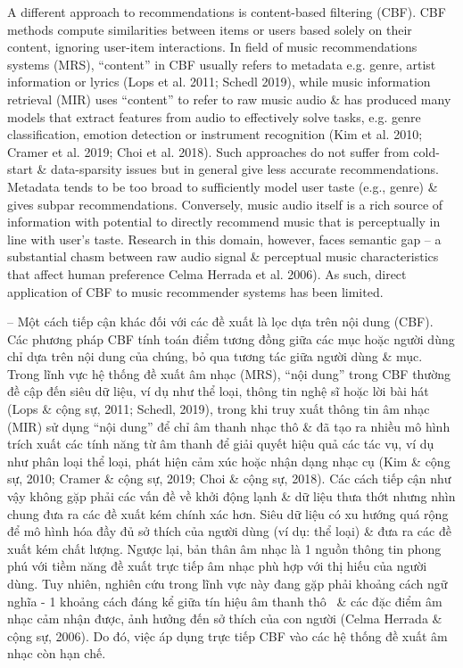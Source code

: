 \documentclass{article}
\begin{document}
\begin{itemize}
    A different approach to recommendations is content-based filtering (CBF). CBF methods compute similarities between items or users based solely on their content, ignoring user-item interactions. In field of music recommendations systems (MRS), ``content'' in CBF usually refers to metadata e.g. genre, artist information or lyrics (Lops et al. 2011; Schedl 2019), while music information retrieval (MIR) uses ``content'' to refer to raw music audio \& has produced many models that extract features from audio to effectively solve tasks, e.g. genre classification, emotion detection or instrument recognition (Kim et al. 2010; Cramer et al. 2019; Choi et al. 2018). Such approaches do not suffer from cold-start \& data-sparsity issues but in general give less accurate recommendations. Metadata tends to be too broad to sufficiently model user taste (e.g., genre) \& gives subpar recommendations. Conversely, music audio itself is a rich source of information with potential to directly recommend music that is perceptually in line with user's taste. Research in this domain, however, faces semantic gap -- a substantial chasm between raw audio signal \& perceptual music characteristics that affect human preference Celma Herrada et al. 2006). As such, direct application of CBF to music recommender systems has been limited.

    -- Một cách tiếp cận khác đối với các đề xuất là lọc dựa trên nội dung (CBF). Các phương pháp CBF tính toán điểm tương đồng giữa các mục hoặc người dùng chỉ dựa trên nội dung của chúng, bỏ qua tương tác giữa người dùng \& mục. Trong lĩnh vực hệ thống đề xuất âm nhạc (MRS), ``nội dung'' trong CBF thường đề cập đến siêu dữ liệu, ví dụ như thể loại, thông tin nghệ sĩ hoặc lời bài hát (Lops \& cộng sự, 2011; Schedl, 2019), trong khi truy xuất thông tin âm nhạc (MIR) sử dụng ``nội dung'' để chỉ âm thanh nhạc thô \& đã tạo ra nhiều mô hình trích xuất các tính năng từ âm thanh để giải quyết hiệu quả các tác vụ, ví dụ như phân loại thể loại, phát hiện cảm xúc hoặc nhận dạng nhạc cụ (Kim \& cộng sự, 2010; Cramer \& cộng sự, 2019; Choi \& cộng sự, 2018). Các cách tiếp cận như vậy không gặp phải các vấn đề về khởi động lạnh \& dữ liệu thưa thớt nhưng nhìn chung đưa ra các đề xuất kém chính xác hơn. Siêu dữ liệu có xu hướng quá rộng để mô hình hóa đầy đủ sở thích của người dùng (ví dụ: thể loại) \& đưa ra các đề xuất kém chất lượng. Ngược lại, bản thân âm nhạc là 1 nguồn thông tin phong phú với tiềm năng đề xuất trực tiếp âm nhạc phù hợp với thị hiếu của người dùng. Tuy nhiên, nghiên cứu trong lĩnh vực này đang gặp phải khoảng cách ngữ nghĩa - 1 khoảng cách đáng kể giữa tín hiệu âm thanh thô \ \& các đặc điểm âm nhạc cảm nhận được, ảnh hưởng đến sở thích của con người (Celma Herrada \& cộng sự, 2006). Do đó, việc áp dụng trực tiếp CBF vào các hệ thống đề xuất âm nhạc còn hạn chế.


\end{itemize}
\end{document}

